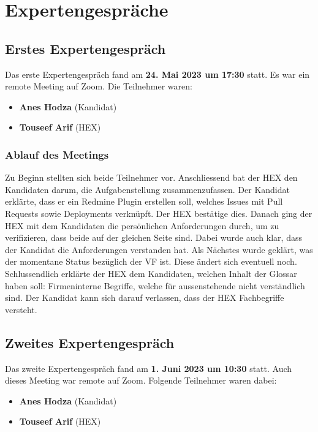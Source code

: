 \chapter{Expertengespräche}
\section{Erstes Expertengespräch}
\label{sec:first-expert-meeting}
Das erste Expertengespräch fand am \textbf{24. Mai 2023 um 17:30} statt. Es war ein remote Meeting auf Zoom.
Die Teilnehmer waren:
\begin{itemize}
  \item \textbf{Anes Hodza} (Kandidat)
  \item \textbf{Touseef Arif} (HEX)
\end{itemize}

\subsection{Ablauf des Meetings}
Zu Beginn stellten sich beide Teilnehmer vor. Anschliessend bat der HEX den Kandidaten darum, die Aufgabenstellung
zusammenzufassen. Der Kandidat erklärte, dass er ein Redmine Plugin erstellen soll, welches \gls{Issue}s mit Pull Requests
sowie Deployments verknüpft. Der HEX bestätige dies. \newline
Danach ging der HEX mit dem Kandidaten die persönlichen Anforderungen durch, um zu verifizieren, dass beide auf der
gleichen Seite sind. Dabei wurde auch klar, dass der Kandidat die Anforderungen verstanden hat. \newline
Als Nächstes wurde geklärt, was der momentane Status bezüglich der VF ist. Diese ändert sich eventuell noch. \newline
Schlussendlich erklärte der HEX dem Kandidaten, welchen Inhalt der Glossar haben soll: Firmeninterne Begriffe, welche
für aussenstehende nicht verständlich sind. Der Kandidat kann sich darauf verlassen, dass der HEX Fachbegriffe
versteht.

\section{Zweites Expertengespräch}
\label{sec:second-expert-meeting}
Das zweite Expertengespräch fand am \textbf{1. Juni 2023 um 10:30} statt. Auch dieses Meeting war remote auf Zoom.
Folgende Teilnehmer waren dabei:
\begin{itemize}
  \item \textbf{Anes Hodza} (Kandidat)
  \item \textbf{Touseef Arif} (HEX)
\end{itemize}

